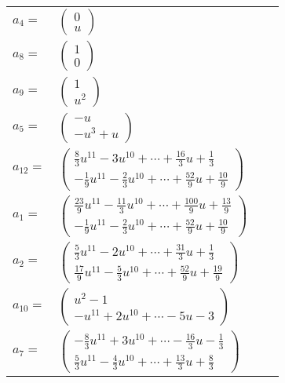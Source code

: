 \documentclass[1p]{elsarticle_modified}
\theoremstyle{definition}
\begin{document}
\begin{tabular}{m{7pt} m{180pt} m{7pt} m{180pt} }
\flushright $a_{4}=$&$\begin{pmatrix}0\\u\end{pmatrix}$ \\
\flushright $a_{8}=$&$\begin{pmatrix}1\\0\end{pmatrix}$ \\
\flushright $a_{9}=$&$\begin{pmatrix}1\\u^2\end{pmatrix}$ \\
\flushright $a_{5}=$&$\begin{pmatrix}- u\\- u^3+u\end{pmatrix}$ \\
\flushright $a_{12}=$&$\begin{pmatrix}\frac{8}{3} u^{11}-3 u^{10}+\cdots+\frac{16}{3} u+\frac{1}{3}\\-\frac{1}{9} u^{11}-\frac{2}{3} u^{10}+\cdots+\frac{52}{9} u+\frac{10}{9}\end{pmatrix}$ \\
\flushright $a_{1}=$&$\begin{pmatrix}\frac{23}{9} u^{11}-\frac{11}{3} u^{10}+\cdots+\frac{100}{9} u+\frac{13}{9}\\-\frac{1}{9} u^{11}-\frac{2}{3} u^{10}+\cdots+\frac{52}{9} u+\frac{10}{9}\end{pmatrix}$ \\
\flushright $a_{2}=$&$\begin{pmatrix}\frac{5}{3} u^{11}-2 u^{10}+\cdots+\frac{31}{3} u+\frac{1}{3}\\\frac{17}{9} u^{11}-\frac{5}{3} u^{10}+\cdots+\frac{52}{9} u+\frac{19}{9}\end{pmatrix}$ \\
\flushright $a_{10}=$&$\begin{pmatrix}u^2-1\\- u^{11}+2 u^{10}+\cdots-5 u-3\end{pmatrix}$ \\
\flushright $a_{7}=$&$\begin{pmatrix}-\frac{8}{3} u^{11}+3 u^{10}+\cdots-\frac{16}{3} u-\frac{1}{3}\\\frac{5}{3} u^{11}-\frac{4}{3} u^{10}+\cdots+\frac{13}{3} u+\frac{8}{3}\end{pmatrix}$ \\

\end{tabular}
\end{document}
